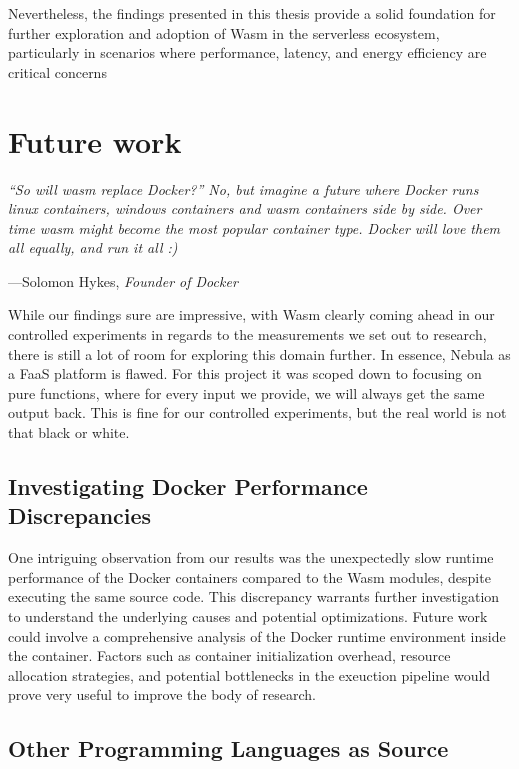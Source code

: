 \documentclass[
  table]{report}
\begin{document}
Nevertheless, the findings presented in this thesis provide a solid
foundation for further exploration and adoption of Wasm in the
serverless ecosystem, particularly in scenarios where performance,
latency, and energy efficiency are critical concerns

\newpage
\chapter{Future work}

\setlength{}

\epigraph{\itshape 
“So will wasm replace Docker?” No, but imagine a future where Docker runs linux
containers, windows containers and wasm containers side by side. Over time wasm
might become the most popular container type. Docker will love them all equally,
and run it all :)
}{---Solomon Hykes, \textit{Founder of Docker}}

While our findings sure are impressive, with \ac{Wasm} clearly coming
ahead in our controlled experiments in regards to the measurements we
set out to research, there is still a lot of room for exploring this
domain further. In essence, Nebula as a \ac{FaaS} platform is flawed.
For this project it was scoped down to focusing on pure functions, where
for every input we provide, we will always get the same output back.
This is fine for our controlled experiments, but the real world is not
that black or white.

\section{Investigating Docker Performance Discrepancies}

One intriguing observation from our results was the unexpectedly slow
runtime performance of the Docker containers compared to the \ac{Wasm}
modules, despite executing the same source code. This discrepancy
warrants further investigation to understand the underlying causes and
potential optimizations. Future work could involve a comprehensive
analysis of the Docker runtime environment inside the container. Factors
such as container initialization overhead, resource allocation
strategies, and potential bottlenecks in the exeuction pipeline would
prove very useful to improve the body of research.

\section{Other Programming Languages as Source}
\end{document}
